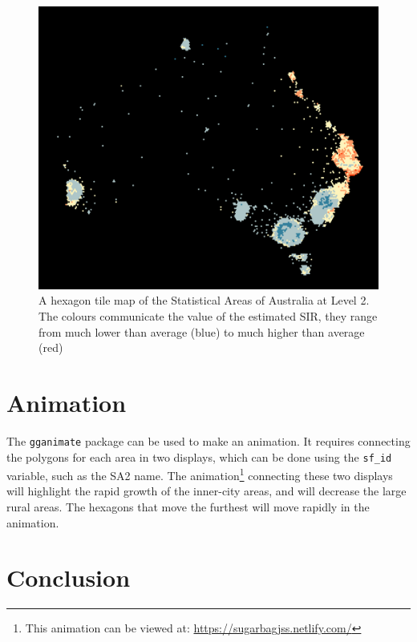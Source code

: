 \documentclass{monashthesis}
\begin{document}
\begin{figure}[H]
\centering
\includegraphics[width=14cm]{figures/03-algorithm/aus_melanoma_p_hex.pdf}
\caption{\label{fig:melanoma-hex}A hexagon tile map of the Statistical Areas of Australia at Level 2. The colours communicate the value of the estimated SIR, they range from much lower than average (blue) to much higher than average (red)}
\end{figure}

\hypertarget{animation}{%
\section{Animation}\label{animation}}

The \texttt{gganimate} \autocite{gganimate} package can be used to make an animation.
It requires connecting the polygons for each area in two displays, which can be done using the \texttt{sf\_id} variable, such as the SA2 name.
The animation\footnote{This animation can be viewed at: \url{https://sugarbagjss.netlify.com/}} connecting these two displays will highlight the rapid growth of the inner-city areas, and will decrease the large rural areas. The hexagons that move the furthest will move rapidly in the animation.

\hypertarget{conclusion-03}{%
\section{Conclusion}\label{conclusion-03}}
\end{document}
